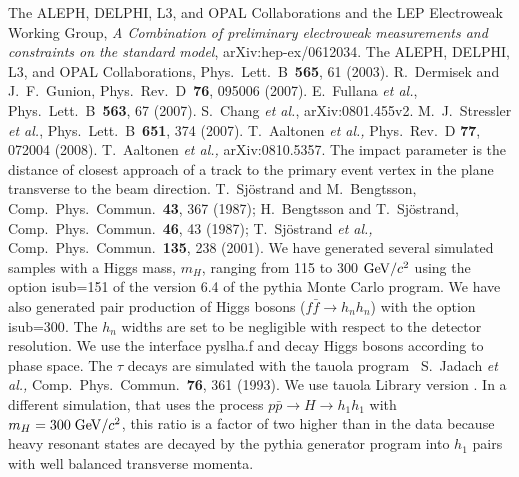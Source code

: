  \begin{thebibliography}{99}
 \label{bibliography}
 The ALEPH,  DELPHI, L3, and OPAL Collaborations and the LEP
                  Electroweak Working Group, {\it A Combination of preliminary
                  electroweak measurements and constraints on the standard
                  model}, arXiv:hep-ex/0612034.
    The ALEPH,  DELPHI, L3, and OPAL Collaborations,
                  Phys.~Lett.~B~{\bf 565}, 61 (2003).
  R.~Dermisek and J.~F.~Gunion, Phys.~Rev.~D~{\bf 76}, 095006
                  (2007).
 E.~Fullana {\it et al.}, Phys.~Lett.~B~{\bf 563}, 67 (2007).
 S.~Chang {\it et al.}, arXiv:0801.455v2.
  M.~J.~Stressler {\it et al.}, Phys.~Lett.~B~{\bf 651}, 374
                  (2007).
    T.~Aaltonen {\it et al.,} Phys.~Rev.~D {\bf 77}, 072004 (2008).
  T.~Aaltonen {\it et al.,} arXiv:0810.5357.
      The impact parameter is the distance of closest approach of
                  a track to the primary event vertex in the plane transverse 
                    to the beam direction.
  T.~Sj\"{o}strand and M.~Bengtsson, 
                  Comp.~Phys.~Commun.~{\bf 43}, 367 (1987);
                  H.~Bengtsson and T.~Sj\"{o}strand,
                  Comp.~Phys.~Commun.~{\bf 46}, 43 (1987);
                  T.~Sj\"{o}strand {\it et al.,} Comp.~Phys.~Commun.~{\bf 135},
                  238 (2001).
     We have generated several simulated samples with a Higgs
                  mass, $m_H$, ranging from 115 to 300 ${\rm GeV/}c^2$ using the 
                  option {\sc isub=151} of the version 6.4 of the {\sc pythia}
                  Monte Carlo program. We have also generated pair production
                  of Higgs bosons ($f\bar{f} \rightarrow h_n h_n$) with the
                  option {\sc isub=300}. The $h_n$ widths are set to be negligible
                  with respect to the detector resolution. 
                   We use the interface {\sc pyslha.f}
                  and decay Higgs bosons according to phase space. The $\tau$
                  decays are simulated with the {\sc tauola}
                  program~\cite{tauola} 
  S.~Jadach {\it et al.,} Comp.~Phys.~Commun.~{\bf 76}, 361
                  (1993). We use {\sc tauola} Library version {}.
    In a different simulation, that uses the process
                  $p\bar{p} \rightarrow H \rightarrow h_1 h_1$ with 
                  $m_H =300 \; {\rm GeV/}c^2$, this ratio is a factor of two higher
                  than in the data because heavy resonant states are decayed
                  by the {\sc pythia} generator program into $h_1$ pairs with
                  well balanced transverse momenta.

\end{thebibliography}








